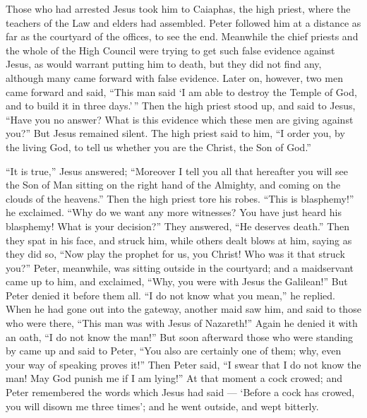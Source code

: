  Those who had arrested Jesus took him to Caiaphas, the
high priest, where the teachers of the Law and elders had assembled.
 Peter followed him at a distance as far as the courtyard
of the offices, to see the end.  Meanwhile the chief
priests and the whole of the High Council were trying to get such false
evidence against Jesus, as would warrant putting him to death,
 but they did not find any, although many came forward with
false evidence. Later on, however, two men came forward and said,
 ``This man said `I am able to destroy the Temple of God,
and to build it in three days.'\,''  Then the high priest
stood up, and said to Jesus, ``Have you no answer? What is this evidence
which these men are giving against you?''  But Jesus
remained silent. The high priest said to him, ``I order you, by the
living God, to tell us whether you are the Christ, the Son of God.''

 ``It is true,'' Jesus answered; ``Moreover I tell you all
that hereafter you will see the Son of Man sitting on the right hand of
the Almighty, and coming on the clouds of the heavens.'' 
Then the high priest tore his robes. ``This is blasphemy!'' he
exclaimed. ``Why do we want any more witnesses? You have just heard his
blasphemy!  What is your decision?'' They answered, ``He
deserves death.''  Then they spat in his face, and struck
him, while others dealt blows at him, saying as they did so,
 ``Now play the prophet for us, you Christ! Who was it that
struck you?''  Peter, meanwhile, was sitting outside in the
courtyard; and a maidservant came up to him, and exclaimed, ``Why, you
were with Jesus the Galilean!''  But Peter denied it before
them all. ``I do not know what you mean,'' he replied. 
When he had gone out into the gateway, another maid saw him, and said to
those who were there, ``This man was with Jesus of Nazareth!''
 Again he denied it with an oath, ``I do not know the
man!''  But soon afterward those who were standing by came
up and said to Peter, ``You also are certainly one of them; why, even
your way of speaking proves it!''  Then Peter said, ``I
swear that I do not know the man! May God punish me if I am lying!'' At
that moment a cock crowed;  and Peter remembered the words
which Jesus had said --- `Before a cock has crowed, you will disown me
three times'; and he went outside, and wept bitterly.

